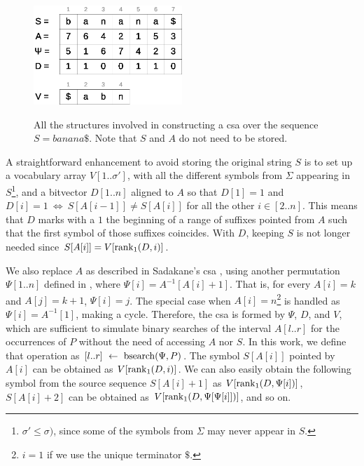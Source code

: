 \documentclass[a4paper,10pt,twoside]{book}
\begin{document}
    \begin{figure}[ht]
		\begin{center}
			{\includegraphics[width=0.5\textwidth]{figures/csa.eps}}
		\end{center}
		\caption{All the structures involved in constructing a \acrlong{csa} over the sequence $S = banana\$$. Note that $S$ and $A$ do not need to be stored.}
		\label{fig:csa}
	\end{figure}
    
    A straightforward enhancement to avoid storing the original string $S$ is to set up a vocabulary array $V[1..\sigma']$, with all the different symbols from $\Sigma$ appearing in $S$\footnote{$\sigma' \leq \sigma)$, since some of the symbols from $\Sigma$ may never appear in $S$.}, and a bitvector $D[1..n]$ aligned to $A$ so that $D[1]=1$ and $D[i]=1~\iff~S[A[i-1]] \neq S[A[i]]$ for all the other $i \in [2..n]$. This means that $D$ marks with a $1$ the beginning of a range of suffixes pointed from $A$ such that the first symbol of those suffixes coincides. With $D$, keeping $S$ is not longer needed since $S[A[i]] = V[\operatorname{rank}_1(D,i)]$.
    
    We also replace $A$ as described in Sadakane's \gls{csa} \cite{Sad03}, using
    another permutation $\Psi[1..n]$ defined in \cite{GV00}, where $\Psi[i] = A^{-1}[A[i]+1]$. That is, for every $A[i]=k$ and $A[j]=k+1$, $\Psi[i]=j$.
    The special case when $A[i]=n$\footnote{$i=1$ if we use the unique terminator $\$$.} is handled as $\Psi[i]=A^{-1}[1]$, making a cycle.
    Therefore, the \gls{csa} is formed by $\Psi$, $D$, and $V$, which are sufficient to simulate binary searches of the interval $A[l..r]$ for the occurrences of $P$ without the need of accessing $A$ nor $S$. In this work, we define that operation as $[l..r]~\leftarrow~\operatorname{bsearch}(\Psi,P)$.
    The symbol $S[A[i]]$ pointed by $A[i]$ can be obtained as
    $V[\operatorname{rank}_1(D,i)]$. We can also easily obtain the following symbol from the source sequence  $S[A[i]+1]$ as
    $V[\operatorname{rank}_1(D, \Psi[i])]$, $S[A[i]+2]$ can be obtained as $V[\operatorname{rank}_1(D, \Psi[\Psi[i]])]$, and so on.
    
\end{document}
